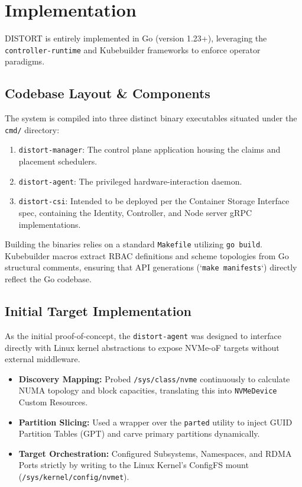 \documentclass[sigconf]{acmart}
\begin{document}
\section{Implementation}
DISTORT is entirely implemented in Go (version 1.23+), leveraging the \texttt{controller-runtime} and Kubebuilder frameworks to enforce operator paradigms. 

\subsection{Codebase Layout \& Components}
The system is compiled into three distinct binary executables situated under the \texttt{cmd/} directory:
\begin{enumerate}
    \item \texttt{distort-manager}: The control plane application housing the claims and placement schedulers.
    \item \texttt{distort-agent}: The privileged hardware-interaction daemon.
    \item \texttt{distort-csi}: Intended to be deployed per the Container Storage Interface spec, containing the Identity, Controller, and Node server gRPC implementations.
\end{enumerate}

Building the binaries relies on a standard \texttt{Makefile} utilizing \texttt{go build}. Kubebuilder macros extract RBAC definitions and scheme topologies from Go structural comments, ensuring that API generations (`\texttt{make manifests}`) directly reflect the Go codebase.

\subsection{Initial Target Implementation}
As the initial proof-of-concept, the \texttt{distort-agent} was designed to interface directly with Linux kernel abstractions to expose NVMe-oF targets without external middleware. 
\begin{itemize}
    \item \textbf{Discovery Mapping:} Probed \texttt{/sys/class/nvme} continuously to calculate NUMA topology and block capacities, translating this into \texttt{NVMeDevice} Custom Resources.
    \item \textbf{Partition Slicing:} Used a wrapper over the \texttt{parted} utility to inject GUID Partition Tables (GPT) and carve primary partitions dynamically.
    \item \textbf{Target Orchestration:} Configured Subsystems, Namespaces, and RDMA Ports strictly by writing to the Linux Kernel's ConfigFS mount (\texttt{/sys/kernel/config/nvmet}).
\end{itemize}
\end{document}
